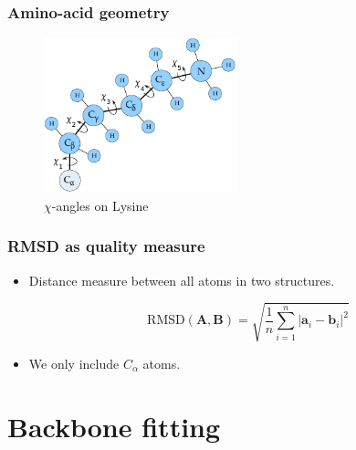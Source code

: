 \documentclass{beamer}
\renewcommand\v[1]{\boldsymbol{#1}}
\begin{document}
\begin{frame}[t, fragile]
  \frametitle{Amino-acid geometry}
  \vspace{0.5cm}
  \begin{figure}
    \centering
    \includegraphics[width=0.5\textwidth]{../rapport/figures/lysine.pdf}
    \caption{$\chi$-angles on Lysine}
    \label{fig:front}
  \end{figure}
\end{frame}

\begin{frame}[t, fragile]
  \frametitle{RMSD as quality measure}
  \begin{itemize}
  \item Distance measure between all atoms in two structures.

\begin{displaymath}
  \label{eq:rmsd}
  \text{RMSD}(\v{A}, \v{B}) = \sqrt{\frac{1}{n}\sum_{i=1}^n |\v{a}_i - \v{b}_i|^2}
\end{displaymath}
  \item We only include $C_\alpha$ atoms.
  \end{itemize}
  
\end{frame}

\section{Backbone fitting}
\end{document}
